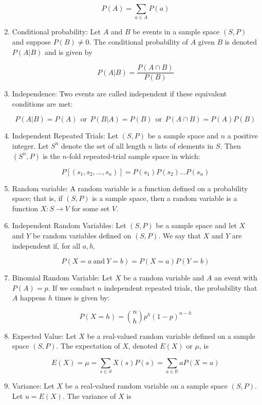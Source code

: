 \documentclass{article}
\begin{document}
\begin{enumerate}
    $$P(A)=\sum_{a\in A}P(a)$$
    
    \item Conditional probability: Let $A$ and $B$ be events in a sample space $(S,P)$ and suppose $P(B)\neq 0$. The conditional probability of $A$ given $B$ is denoted $P(A|B)$ and is given by 
    
    $$P(A|B)=\frac{P(A\cap B)}{P(B)}$$
    
    \item Independence: Two events are called independent if these equivalent conditions are met: 
    
    $$P(A|B)=P(A)\:\: \text{or} \:\: P(B|A)=P(B) \:\: \text{or} \:\: P(A\cap B)=P(A)P(B)$$
    
    \item Independent Repeated Trials: Let $(S,P)$ be a sample space and $n$ a positive integer. Let $S^n$ denote the set of all length $n$ lists of elements in $S$. Then $(S^n,P)$ is the $n$-fold repeated-trial sample space in which: 
    
    $$P[(s_1,s_2,...,s_n)]=P(s_1)P(s_2)...P(s_n)$$
    
    \item Random variable: A random variable is a function defined on a probability space; that is, if $(S,P)$ is a sample space, then a random variable is a function $X:S\to V$ for some set $V$.
    
    \item Independent Random Variables: Let $(S,P)$ be a sample space and let $X$ and $Y$ be random variables defined on $(S,P)$. We say that $X$ and $Y$ are independent if, for all $a,b$, 
    
    $$P(X=a\: \text{and} \: Y=b)=P(X=a)P(Y=b)$$
    
    \item Binomial Random Variable: Let $X$ be a random variable and $A$ an event with $P(A)=p$. If we conduct $n$ independent repeated trials, the probability that $A$ happens $h$ times is given by:
    
     $$P(X=h)= {n \choose h} p^h(1-p)^{n-h}$$ 
    
    \item Expected Value: Let $X$ be a real-valued random variable defined on a sample space $(S,P)$. The expectation of $X$, denoted $E(X)$ or $\mu$, is 
    
    $$E(X)=\mu=\sum_{s\in S}X(s)P(s)=\sum_{a\in\mathbb{R}}aP(X=a)$$ 
    
    \item Variance: Let $X$ be a real-valued random variable on a sample space $(S,P)$. Let $u=E(X)$. The variance of $X$ is
    

\end{enumerate}
\end{document}
